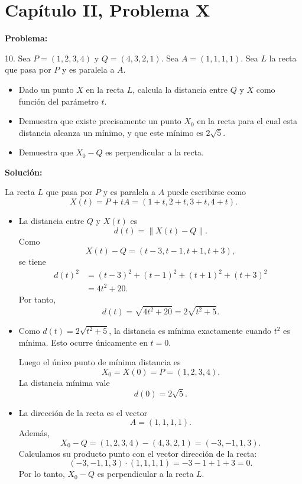 \section*{Capítulo II, Problema X}

\textbf{Problema:}

10. Sea $P = (1,2,3,4)$ y $Q = (4,3,2,1)$. Sea $A = (1,1,1,1)$. Sea $L$ la recta que pasa por $P$ y es paralela a $A$.

\begin{itemize}
    \item[(a)] Dado un punto $X$ en la recta $L$, calcula la distancia entre $Q$ y $X$ como función del parámetro $t$.
    \item[(b)] Demuestra que existe precisamente un punto $X_0$ en la recta para el cual esta distancia alcanza un mínimo, y que este mínimo es $2\sqrt{5}$.
    \item[(c)] Demuestra que $X_0 - Q$ es perpendicular a la recta.
\end{itemize}

\textbf{Solución:}

La recta $L$ que pasa por $P$ y es paralela a $A$ puede escribirse como
\[
    X(t) = P + tA = (1+t, 2+t, 3+t, 4+t).
\]

\begin{itemize}
    \item[(a)] La distancia entre $Q$ y $X(t)$ es
    \[
        d(t) = \|X(t) - Q\|.
    \]
    Como
    \[
        X(t) - Q = (t-3, t-1, t+1, t+3),
    \]
    se tiene
    \begin{align*}
        d(t)^2 &= (t-3)^2 + (t-1)^2 + (t+1)^2 + (t+3)^2 \\
               &= 4t^2 + 20.
    \end{align*}
    Por tanto,
    \[
        d(t) = \sqrt{4t^2 + 20} = 2\sqrt{t^2 + 5}.
    \]

    \item[(b)] Como $d(t) = 2\sqrt{t^2+5}$, la distancia es mínima exactamente cuando $t^2$ es mínima. Esto ocurre únicamente en $t=0$.

    Luego el único punto de mínima distancia es
    \[
        X_0 = X(0) = P = (1,2,3,4).
    \]
    La distancia mínima vale
    \[
        d(0) = 2\sqrt{5}.
    \]

    \item[(c)] La dirección de la recta es el vector
    \[
        A = (1,1,1,1).
    \]
    Además,
    \[
        X_0 - Q = (1,2,3,4) - (4,3,2,1) = (-3,-1,1,3).
    \]
    Calculamos su producto punto con el vector dirección de la recta:
    \[
        (-3,-1,1,3) \cdot (1,1,1,1) = -3 - 1 + 1 + 3 = 0.
    \]
    Por lo tanto, $X_0 - Q$ es perpendicular a la recta $L$.
\end{itemize}